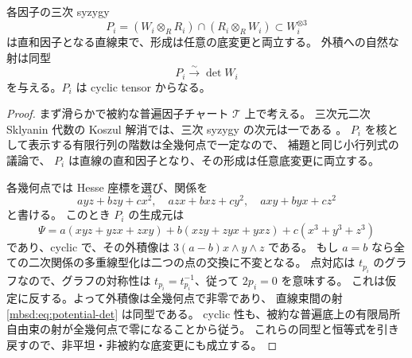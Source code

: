 \begin{lemma}
\label{mbsd:lem:potential-line}
各因子の三次 syzygy
\[
 P_i=(W_i\otimes_RR_i)\cap(R_i\otimes_RW_i)
       \subset W_i^{\otimes3}
\]
は直和因子となる直線束で、形成は任意の底変更と両立する。
外積への自然な射は同型
\begin{equation}\label{mbsd:eq:potential-det}
 P_i\xrightarrow{\sim}\det W_i
\end{equation}
を与える。$P_i$ は cyclic tensor からなる。
\end{lemma}
\begin{proof}
まず滑らかで被約な普遍因子チャート $\mathcal T$ 上で考える。
三次元二次 Sklyanin 代数の Koszul 解消では、三次 syzygy の次元は一である
\cite[Theorems~6.6, 6.8]{GRSklyaninATV}。
$P_i$ を核として表示する有限行列の階数は全幾何点で一定なので、
補題と同じ小行列式の議論で、
$P_i$ は直線の直和因子となり、その形成は任意底変更に両立する。

各幾何点では Hesse 座標を選び、関係を
\[
 a yz+b zy+c x^2,\quad
 a zx+b xz+c y^2,\quad
 a xy+b yx+c z^2
\]
と書ける\cite[\S1, pp.~20--21]{GRSklyaninST}。
このとき $P_i$ の生成元は
\[
 \Psi=a(xyz+yzx+zxy)+b(xzy+zyx+yxz)+c(x^3+y^3+z^3)
\]
であり、cyclic で、その外積像は $3(a-b)x\wedge y\wedge z$ である。
もし $a=b$ なら全ての二次関係の多重線型化は二つの点の交換に不変となる。
点対応は $t_{p_i}$ のグラフなので、グラフの対称性は
$t_{p_i}=t_{p_i}^{-1}$、従って $2p_i=0$ を意味する。
これは仮定に反する。よって外積像は全幾何点で非零であり、
直線束間の射 \eqref{mbsd:eq:potential-det} は同型である。
cyclic 性も、被約な普遍底上の有限局所自由束の射が全幾何点で零になることから従う。
これらの同型と恒等式を引き戻すので、非平坦・非被約な底変更にも成立する。
\end{proof}

